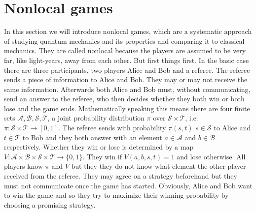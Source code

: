 \section{Nonlocal games}
In this section we will introduce nonlocal games, which are a systematic approach of studying quantum mechanics and its properties and comparing it to classical mechanics. They are called nonlocal because the players are assumed to be very far, like light-years, away from each other. But first things first. In the basic case there are three participants, two players Alice and Bob and a referee. The referee sends a piece of information to Alice and Bob. They may or may not receive the same information. Afterwards both Alice and Bob must, without communicating, send an answer to the referee, who then decides whether they both win or both lose and the game ends. Mathematically speaking this means there are four finite sets $\mathcal{A}, \mathcal{B}, \mathcal{S}, \mathcal{T}$, a joint probability distribution $\pi$ over $\mathcal{S} \times \mathcal{T}$, i.e. $\pi : \mathcal{S} \times \mathcal{T} \rightarrow [0,1]$. The referee sends with probability $\pi(s,t)$ $s \in \mathcal{S}$ to Alice and $t \in \mathcal{T}$ to Bob and they both answer with an element $a \in \mathcal{A}$ and $b \in \mathcal{B}$ respectively. Whether they win or lose is determined by a map $V : \mathcal{A} \times \mathcal{B} \times \mathcal{S} \times \mathcal{T} \rightarrow \{ 0 , 1 \}$. They win if $V(a,b,s,t)=1$ and lose otherwise. All players know $\pi$ and $V$ but they they do not know what element the other player received from the referee. They may agree on a strategy beforehand but they must not communicate once the game has started. Obviously, Alice and Bob want to win the game and so they try to maximize their winning probability by choosing a promising strategy.

